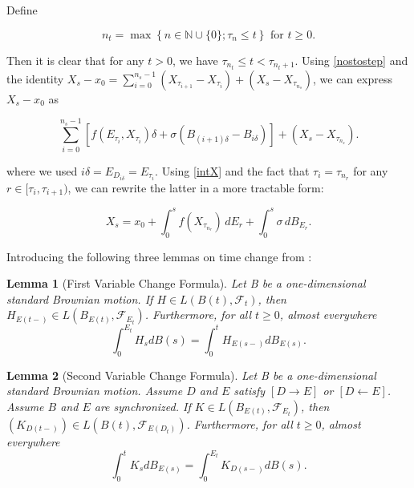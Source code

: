 \documentclass[10pt,reqno,final]{amsart}
\theoremstyle{plain}
\newtheorem{lemma}{Lemma}[section]
\theoremstyle{definition}
\theoremstyle{remark}
\numberwithin{equation}{section}
\numberwithin{figure}{section}
\numberwithin{table}{section}
\begin{document}
Define



\[
n_t = \max\left\{n \in \mathbb{N} \cup \{0\}; \tau_n \leq t\right\} \text{ for } t \geq 0.
\]



Then it is clear that for any \( t > 0 \), we have \( \tau_{n_t} \leq t < \tau_{n_t+1} \). Using \cref{nostostep} and the identity \( X_s - x_0 = \sum_{i=0}^{n_s-1} \left(X_{\tau_{i+1}} - X_{\tau_i}\right) + \left(X_s - X_{\tau_{n_s}}\right) \), we can express \( X_s - x_0 \) as



\[
\sum_{i=0}^{n_s-1} \left[ f\left(E_{\tau_i}, X_{\tau_i}\right)\delta + \sigma\left(B_{(i+1)\delta} - B_{i\delta}\right)\right] + \left(X_s - X_{\tau_{n_s}}\right).
\]



where we used \( i\delta = E_{D_{i\delta}} = E_{\tau_i} \). Using \cref{intX} and the fact that \(\tau_i = \tau_{n_r}\) for any \( r \in [\tau_i, \tau_{i+1}) \), we can rewrite the latter in a more tractable form:

\begin{equation}
	X_s = x_0 + \int_{0}^{s} f\left(X_{\tau_{n_r}}\right) \, dE_r + \int_{0}^{s} \sigma \, dB_{E_r}.
\end{equation}

Introducing the following three lemmas on time change from \cite{umarov2018beyond}:

\begin{lemma}[First Variable Change Formula]\label{first}
	Let B be a one-dimensional standard Brownian motion.
	If $H \in L(B(t), \mathcal{F}_t)$, then $H_{E(t-)} \in L(B_{E(t)}, \mathcal{F}_{E_t})$.
	Furthermore, for all $t \geqslant 0$, almost everywhere
	$$
	\int_0^{E_t} H_s dB(s) = \int_0^t H_{E(s-)} dB_{E(s)}.
	$$
\end{lemma}
\begin{lemma}[Second Variable Change Formula]\label{second}
	Let B be a one-dimensional standard Brownian motion. Assume $D$ and $E$ satisfy $[D \longrightarrow E]$ or $[D \longleftarrow E]$.
	Assume $B$ and $E$ are synchronized. If $K \in L(B_{E(t)}, \mathcal{F}_{E_t})$, then $(K_{D(t-)}) \in L(B(t), \mathcal{F}_{E(D_t)})$.
	Furthermore, for all $t \geqslant 0$, almost everywhere
	$$
	\int_0^t K_s dB_{E(s)} = \int_0^{E_t} K_{D(s-)} dB(s).
	$$
\end{lemma}
\end{document}
